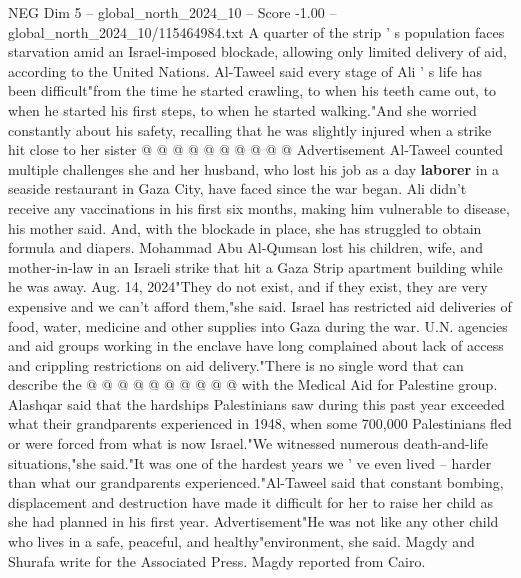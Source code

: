 \begin{textsample}{NEG Dim 5 – global\_north\_2024\_10 – Score -1.00 – global\_north\_2024\_10/115464984.txt}
A quarter of the strip ' s population faces starvation amid an Israel-imposed blockade, allowing only limited delivery of aid, according to the United Nations.
Al-Taweel said every stage of Ali ' s life has been difficult"from the time he started crawling, to when his teeth came out, to when he started his first steps, to when he started walking."And she worried constantly about his safety, recalling that he was slightly injured when a strike hit close to her sister @ @ @ @ @ @ @ @ @ @ Advertisement Al-Taweel counted multiple challenges she and her husband, who lost his job as a day \textbf{laborer} in a seaside restaurant in Gaza City, have faced since the war began.
Ali didn't receive any vaccinations in his first six months, making him vulnerable to disease, his mother said.
And, with the blockade in place, she has struggled to obtain formula and diapers.
Mohammad Abu Al-Qumsan lost his children, wife, and mother-in-law in an Israeli strike that hit a Gaza Strip apartment building while he was away.
Aug. 14, 2024"They do not exist, and if they exist, they are very expensive and we can't afford them,"she said.
Israel has restricted aid deliveries of food, water, medicine and other supplies into Gaza during the war.
U.N. agencies and aid groups working in the enclave have long complained about lack of access and crippling restrictions on aid delivery."There is no single word that can describe the @ @ @ @ @ @ @ @ @ @ with the Medical Aid for Palestine group.
Alashqar said that the hardships Palestinians saw during this past year exceeded what their grandparents experienced in 1948, when some 700,000 Palestinians fled or were forced from what is now Israel."We witnessed numerous death-and-life situations,"she said."It was one of the hardest years we ' ve even lived -- harder than what our grandparents experienced."Al-Taweel said that constant bombing, displacement and destruction have made it difficult for her to raise her child as she had planned in his first year.
Advertisement"He was not like any other child who lives in a safe, peaceful, and healthy"environment, she said.
Magdy and Shurafa write for the Associated Press.
Magdy reported from Cairo.

\end{textsample}
